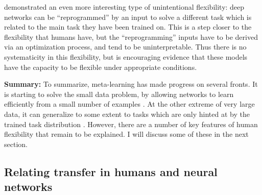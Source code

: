 \documentclass[11pt]{article}
\begin{document}
\citet{Elsayed} demonstrated an even more interesting type of unintentional flexibility: deep networks can be ``reprogrammed'' by an input to solve a different task which is related to the main task they have been trained on. This is a step closer to the flexibility that humans have, but the ``reprogramming'' inputs have to be derived via an optimization process, and tend to be uninterpretable. Thus there is no systematicity in this flexibility, but is encouraging evidence that these models have the capacity to be flexible under appropriate conditions. \par  
\textbf{Summary:} To summarize, meta-learning has made progress on several fronts. It is starting to solve the small data problem, by allowing networks to learn efficiently from a small number of examples \citep[e.g.]{Wang2016a}. At the other extreme of very large data, it can generalize to some extent to tasks which are only hinted at by the trained task distribution \citep[e.g.]{Radford2019}. However, there are a number of key features of human flexibility that remain to be explained. I will discuss some of these in the next section. \par 


\subsection{Relating transfer in humans and neural networks}
\end{document}
